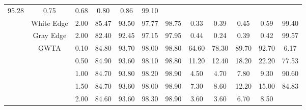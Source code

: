 \begin{table}[htbp]
{\begin{tabular}{cc|c|ccccccccc}
  \multicolumn{1}{c|}{95.28} &
  \multicolumn{1}{c|}{0.75} &
  \multicolumn{1}{c|}{0.68} &
  \multicolumn{1}{c|}{0.80} &
  \multicolumn{1}{c|}{0.86} &
  99.10 \\ \cline{2-12} 
\multicolumn{1}{c|}{} &
  White Edge &
  2.00 &
  \multicolumn{1}{c|}{85.47} &
  \multicolumn{1}{c|}{93.50} &
  \multicolumn{1}{c|}{97.77} &
  \multicolumn{1}{c|}{98.75} &
  \multicolumn{1}{c|}{0.33} &
  \multicolumn{1}{c|}{0.39} &
  \multicolumn{1}{c|}{0.45} &
  \multicolumn{1}{c|}{0.59} &
  99.40 \\ \cline{2-12} 
\multicolumn{1}{c|}{} &
  Gray Edge &
  2.00 &
  \multicolumn{1}{c|}{82.40} &
  \multicolumn{1}{c|}{92.45} &
  \multicolumn{1}{c|}{97.15} &
  \multicolumn{1}{c|}{97.95} &
  \multicolumn{1}{c|}{0.44} &
  \multicolumn{1}{c|}{0.24} &
  \multicolumn{1}{c|}{0.39} &
  \multicolumn{1}{c|}{0.42} &
  99.57 \\ \cline{2-12} 
\multicolumn{1}{c|}{} &
  \multirow{9}{*}{GWTA}&
  0.10 &
  \multicolumn{1}{c|}{84.80} &
  \multicolumn{1}{c|}{93.70} &
  \multicolumn{1}{c|}{98.00} &
  \multicolumn{1}{c|}{98.80} &
  \multicolumn{1}{c|}{64.60} &
  \multicolumn{1}{c|}{78.30} &
  \multicolumn{1}{c|}{89.70} &
  \multicolumn{1}{c|}{92.70} &
  6.17 \\ \cline{3-12} 
\multicolumn{1}{c|}{} &
   &
  0.50 &
  \multicolumn{1}{c|}{84.90} &
  \multicolumn{1}{c|}{93.60} &
  \multicolumn{1}{c|}{98.10} &
  \multicolumn{1}{c|}{98.80} &
  \multicolumn{1}{c|}{11.20} &
  \multicolumn{1}{c|}{12.40} &
  \multicolumn{1}{c|}{18.20} &
  \multicolumn{1}{c|}{22.20} &
  77.53 \\ \cline{3-12} 
\multicolumn{1}{c|}{} &
   &
  1.00 &
  \multicolumn{1}{c|}{84.70} &
  \multicolumn{1}{c|}{93.80} &
  \multicolumn{1}{c|}{98.20} &
  \multicolumn{1}{c|}{98.90} &
  \multicolumn{1}{c|}{4.50} &
  \multicolumn{1}{c|}{4.70} &
  \multicolumn{1}{c|}{7.80} &
  \multicolumn{1}{c|}{9.30} &
  90.60 \\ \cline{3-12} 
\multicolumn{1}{c|}{} &
   &
  1.50 &
  \multicolumn{1}{c|}{84.70} &
  \multicolumn{1}{c|}{93.60} &
  \multicolumn{1}{c|}{98.00} &
  \multicolumn{1}{c|}{98.90} &
  \multicolumn{1}{c|}{7.30} &
  \multicolumn{1}{c|}{8.60} &
  \multicolumn{1}{c|}{12.20} &
  \multicolumn{1}{c|}{15.00} &
  84.83 \\ \cline{3-12} 
\multicolumn{1}{c|}{} &
   &
  2.00 &
  \multicolumn{1}{c|}{84.60} &
  \multicolumn{1}{c|}{93.60} &
  \multicolumn{1}{c|}{98.30} &
  \multicolumn{1}{c|}{98.90} &
  \multicolumn{1}{c|}{3.60} &
  \multicolumn{1}{c|}{3.60} &
  \multicolumn{1}{c|}{6.70} &
  \multicolumn{1}{c|}{8.50} &

\end{tabular}}
\end{table}
